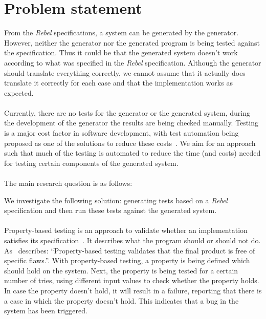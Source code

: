 \section{Problem statement}
From the \textit{Rebel} specifications, a system can be generated by the
generator. However, neither the generator nor the generated program is being
tested against the specification. Thus it could be that the generated system
doesn't work according to what was specified in the \textit{Rebel}
specification. Although the generator should translate everything correctly, we
cannot assume that it actually does translate it correctly for each case and
that the implementation works as expected.\\
\\
Currently, there are no tests for the generator or the generated system, during
the development of the generator the results are being checked manually. Testing
is a major cost factor in software development, with test automation being
proposed as one of the solutions to reduce these
costs~\cite{ramler2006economic}. We aim for an approach such that much of the
testing is automated to reduce the time (and costs) needed for testing certain
components of the generated system.\\
\\
The main research question is as follows:
\begin{quote}
  \rqMain
\end{quote}
We investigate the following solution: generating tests based on a
\textit{Rebel} specification and then run these tests against the generated
system.\\
\\
Property-based testing is an approach to validate whether an implementation
satisfies its specification~\cite{fink1997property}. It describes what the
program should or should not do. As~\cite{fink1997property} describes:
``Property-based testing validates that the final product is free of specific
flaws.''. With property-based testing, a property is being defined which should
hold on the system. Next, the property is being tested for a certain number of
tries, using different input values to check whether the property holds. In case
the property doesn't hold, it will result in a failure, reporting that there is
a case in which the property doesn't hold. This indicates that a bug in the
system has been triggered.\\
